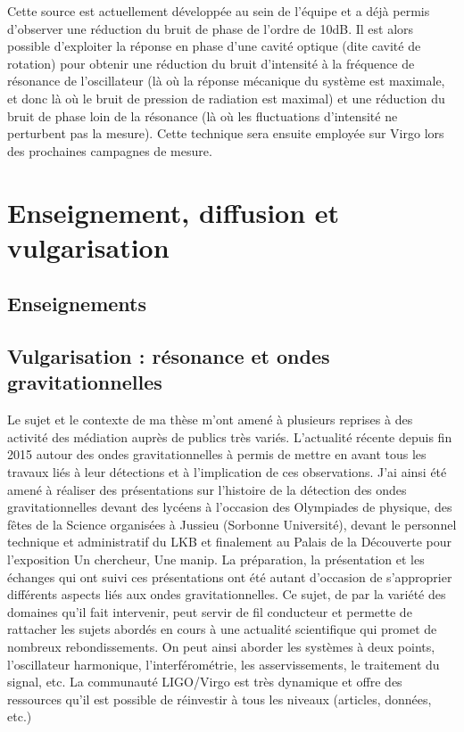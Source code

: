 \documentclass[12pt,a4paper]{article}
\begin{document}
Cette source est actuellement développée au sein de l'équipe et a déjà permis d'observer une réduction du bruit de phase de l'ordre de \unit{10}{dB}.
Il est alors possible d'exploiter la réponse en phase d'une cavité optique (dite cavité de rotation) pour obtenir une réduction du bruit d'intensité à la fréquence de résonance de l'oscillateur (là où la réponse mécanique du système est maximale, et donc là où le bruit de pression de radiation est maximal) et une réduction du bruit de phase loin de la résonance (là où les fluctuations d'intensité ne perturbent pas la mesure).
Cette technique sera ensuite employée sur Virgo lors des prochaines campagnes de mesure.

\section{Enseignement, diffusion et vulgarisation}

\subsection{Enseignements}

\subsection{Vulgarisation : résonance et ondes gravitationnelles}

Le sujet et le contexte de ma thèse m'ont amené à plusieurs reprises à des activité des médiation auprès de publics très variés.
L'actualité récente depuis fin 2015 autour des ondes gravitationnelles à permis de mettre en avant tous les travaux liés à leur détections et à l'implication de ces observations.
J'ai ainsi été amené à réaliser des présentations sur l'histoire de la détection des ondes gravitationnelles devant des lycéens à l'occasion des Olympiades de physique, des fêtes de la Science organisées à Jussieu (Sorbonne Université), devant le personnel technique et administratif du LKB et finalement au Palais de la Découverte pour l'exposition Un chercheur, Une manip.
La préparation, la présentation et les échanges qui ont suivi ces présentations ont été autant d'occasion de s'approprier différents aspects liés aux ondes gravitationnelles.
Ce sujet, de par la variété des domaines qu'il fait intervenir, peut servir de fil conducteur et permette de rattacher les sujets abordés en cours à une actualité scientifique  qui promet de nombreux rebondissements.
On peut ainsi aborder les systèmes à deux points, l'oscillateur harmonique, l'interférométrie, les asservissements, le traitement du signal, etc.
La communauté LIGO/Virgo est très dynamique et offre des ressources qu'il est possible de réinvestir à tous les niveaux (articles, données, etc.)
\end{document}
